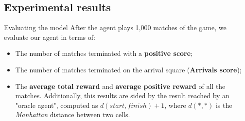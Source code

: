 \documentclass{beamer}
\begin{document}
\subsection{Experimental results}
\begin{frame}{Evaluating the model}
	After the agent plays 1,000 matches of the game, we evaluate our agent in terms of:
	\begin{itemize}
		\item The number of matches terminated with a \textbf{positive score};
		\item The number of matches terminated on the arrival square (\textbf{Arrivals score});
		\item The \textbf{average total reward} and \textbf{average positive reward} of all the matches.
		Additionally, this results are sided by the result reached by an "oracle agent", computed as $d(start, finish) + 1$, where $d(*,*)$ is the \textit{Manhattan} distance between two cells.
	\end{itemize} 	


\begin{table}
\end{table}
\end{frame}
\end{document}
